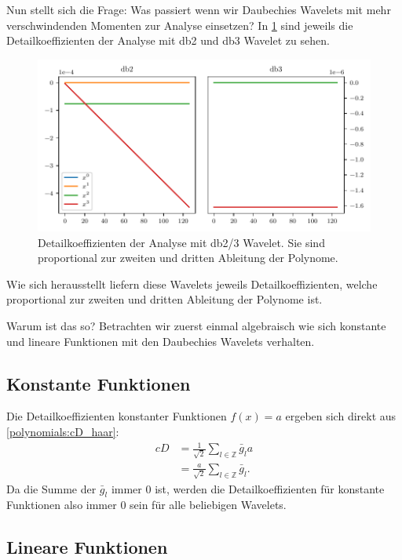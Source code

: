 \begin{refsection}
Nun stellt sich die Frage: Was passiert wenn wir Daubechies Wavelets mit mehr
verschwindenden Momenten zur Analyse einsetzen? In \cref{polynomials:db2_3}
sind jeweils die Detailkoeffizienten der Analyse mit db2 und db3 Wavelet zu
sehen.
\begin{figure}
    \centering
    \includegraphics{papers/polynomials/images/polynomials_signals_db2_3.pdf}
    \caption{Detailkoeffizienten der Analyse mit db2/3 Wavelet. Sie sind
             proportional zur zweiten und dritten Ableitung der
             Polynome.\label{polynomials:db2_3}}
\end{figure}
Wie sich herausstellt liefern diese Wavelets jeweils Detailkoeffizienten,
welche proportional zur zweiten und dritten Ableitung der Polynome ist.

Warum ist das so? Betrachten wir zuerst einmal algebraisch wie sich konstante
und lineare Funktionen mit den Daubechies Wavelets verhalten.

\subsection{Konstante Funktionen}
Die Detailkoeffizienten konstanter Funktionen $f(x) = a$ ergeben sich direkt
aus \cref{polynomials:cD_haar}:
\begin{align*}
    cD &= \frac{1}{\sqrt{2}} \sum_{l\in\mathbb Z} \bar{g}_l a \\
       &= \frac{a}{\sqrt{2}} \sum_{l\in\mathbb Z} \bar{g}_l.
\end{align*}
Da die Summe der $\bar{g}_l$ immer 0 ist, werden die Detailkoeffizienten für
konstante Funktionen also immer 0 sein für alle beliebigen Wavelets.

\subsection{Lineare Funktionen}


\end{refsection}
